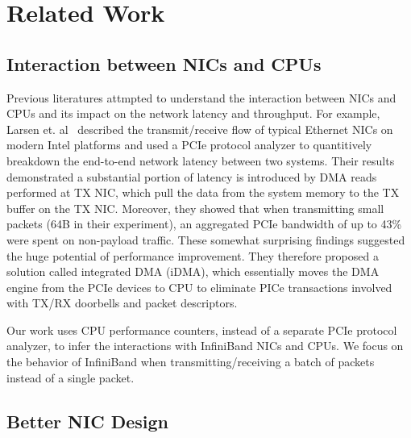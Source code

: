 \section{Related Work}
\label{sec:related}

\subsection{Interaction between NICs and CPUs}

Previous literatures attmpted to understand the interaction between
NICs and CPUs and its impact on the network latency and
throughput. For example, Larsen et. al~\cite{larsen:2011,larsen:2014}
described the transmit/receive flow of typical Ethernet NICs on modern
Intel platforms and used a PCIe protocol analyzer to quantitively
breakdown the end-to-end network latency between two systems. Their
results demonstrated a substantial portion of latency is introduced by
DMA reads performed at TX NIC, which pull the data from the system
memory to the TX buffer on the TX NIC. Moreover, they showed that when
transmitting small packets (64B in their experiment), an aggregated
PCIe bandwidth of up to 43\% were spent on non-payload traffic. These
somewhat surprising findings suggested the huge potential of
performance improvement. They therefore proposed a solution called
integrated DMA (iDMA), which essentially moves the DMA engine from the
PCIe devices to CPU to eliminate PICe transactions involved with TX/RX
doorbells and packet descriptors.

Our work uses CPU performance counters, instead of a separate PCIe
protocol analyzer, to infer the interactions with InfiniBand NICs and
CPUs. We focus on the behavior of InfiniBand when
transmitting/receiving a batch of packets instead of a single packet.

\subsection{Better NIC Design}

